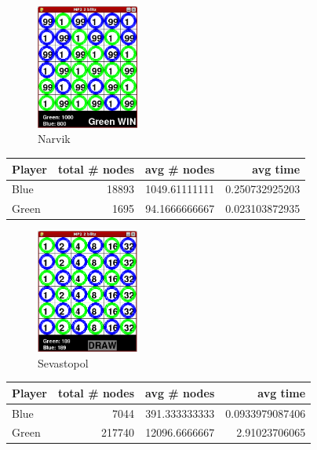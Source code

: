 \begin{multicols*}{2}
\begin{figure}[H]
\centering
\includegraphics[width=0.3\textwidth]{graphics/am_narvik.png}
\caption{Narvik}
\end{figure}
\begin{tabular}{l|r|r|r}
  Player & total \# nodes & avg \# nodes & avg time \\
  \hline
  Blue & 18893 & 1049.61111111 & 0.250732925203 \\
  Green & 1695 & 94.1666666667 & 0.023103872935 \\
\end{tabular}

\begin{figure}[H]
\centering
\includegraphics[width=0.3\textwidth]{graphics/am_sevastopol.png}
\caption{Sevastopol}
\end{figure}
\begin{tabular}{l|r|r|r}
  Player & total \# nodes & avg \# nodes & avg time \\
  \hline
  Blue & 7044 & 391.333333333 & 0.0933979087406 \\
  Green & 217740 & 12096.6666667 & 2.91023706065 \\
\end{tabular}


\end{multicols*}
